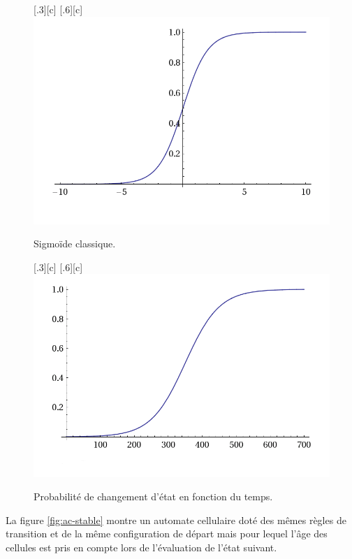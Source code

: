 \documentclass[12pt]{article}
\begin{document}
\begin{figure}[H]
  \centering
  \subcaptionbox{}[.3\linewidth][c]{
  }
  \subcaptionbox{}[.6\linewidth][c]{
    \includegraphics[width=.6\linewidth]{images/sigmoid.png}
  }
  \caption{Sigmoïde classique.}
  \label{fig:sigmoide1}
\end{figure}

\begin{figure}[H]
  \centering
  \subcaptionbox{}[.3\linewidth][c]{
  }
  \subcaptionbox{}[.6\linewidth][c]{
    \includegraphics[width=.6\linewidth]{images/sigmoid-age.png}
  }
  \caption{Probabilité de changement d'état en fonction du temps.}
  \label{fig:sigmoide2}
\end{figure}

La figure \ref{fig:ac-stable} montre un automate cellulaire doté des
mêmes règles de transition et de la même configuration de départ mais
pour lequel l'âge des cellules est pris en compte lors de l'évaluation
de l'état suivant.
\end{document}
